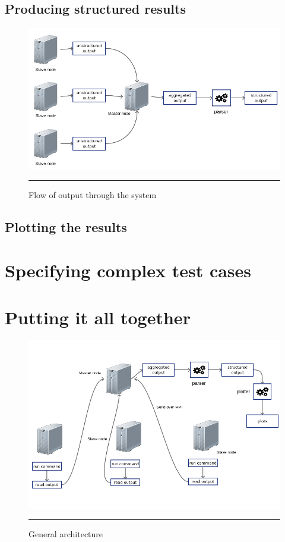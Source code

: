 



\subsection{Producing structured results}


\begin{figure}[H]
  \centering
    \includegraphics[scale=0.5]{Figures/output_flow.png}
    \rule{25em}{0.5pt}
  \caption[Flow of output through the system]{Flow of output through the system}
  \label{fig:output_flow}
\end{figure}


\subsection{Plotting the results}





\section{Specifying complex test cases}




\section{Putting it all together}

\begin{figure}[H]
  \centering
    \includegraphics[scale=0.5]{Figures/architecture.png}
    \rule{25em}{0.5pt}
  \caption[General architecture]{General architecture}
  \label{fig:architecture}
\end{figure}


